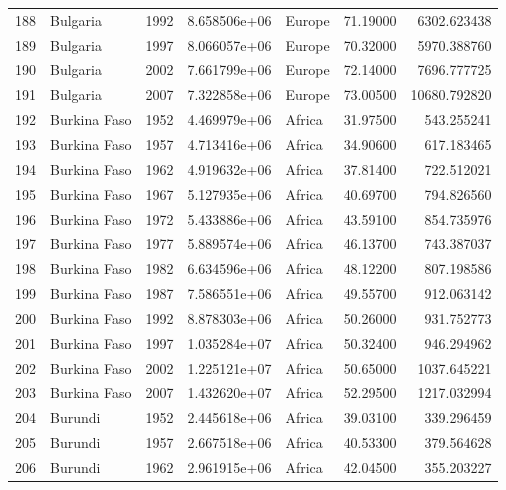 \documentclass[
  letterpaper,
  DIV=11,
  numbers=noendperiod]{scrreprt}
\begin{document}
\begin{tabular}{llrrlrr}
188  &                  Bulgaria &  1992 &  8.658506e+06 &    Europe &  71.19000 &    6302.623438 \\
189  &                  Bulgaria &  1997 &  8.066057e+06 &    Europe &  70.32000 &    5970.388760 \\
190  &                  Bulgaria &  2002 &  7.661799e+06 &    Europe &  72.14000 &    7696.777725 \\
191  &                  Bulgaria &  2007 &  7.322858e+06 &    Europe &  73.00500 &   10680.792820 \\
192  &              Burkina Faso &  1952 &  4.469979e+06 &    Africa &  31.97500 &     543.255241 \\
193  &              Burkina Faso &  1957 &  4.713416e+06 &    Africa &  34.90600 &     617.183465 \\
194  &              Burkina Faso &  1962 &  4.919632e+06 &    Africa &  37.81400 &     722.512021 \\
195  &              Burkina Faso &  1967 &  5.127935e+06 &    Africa &  40.69700 &     794.826560 \\
196  &              Burkina Faso &  1972 &  5.433886e+06 &    Africa &  43.59100 &     854.735976 \\
197  &              Burkina Faso &  1977 &  5.889574e+06 &    Africa &  46.13700 &     743.387037 \\
198  &              Burkina Faso &  1982 &  6.634596e+06 &    Africa &  48.12200 &     807.198586 \\
199  &              Burkina Faso &  1987 &  7.586551e+06 &    Africa &  49.55700 &     912.063142 \\
200  &              Burkina Faso &  1992 &  8.878303e+06 &    Africa &  50.26000 &     931.752773 \\
201  &              Burkina Faso &  1997 &  1.035284e+07 &    Africa &  50.32400 &     946.294962 \\
202  &              Burkina Faso &  2002 &  1.225121e+07 &    Africa &  50.65000 &    1037.645221 \\
203  &              Burkina Faso &  2007 &  1.432620e+07 &    Africa &  52.29500 &    1217.032994 \\
204  &                   Burundi &  1952 &  2.445618e+06 &    Africa &  39.03100 &     339.296459 \\
205  &                   Burundi &  1957 &  2.667518e+06 &    Africa &  40.53300 &     379.564628 \\
206  &                   Burundi &  1962 &  2.961915e+06 &    Africa &  42.04500 &     355.203227 \\

\end{tabular}
\end{document}
